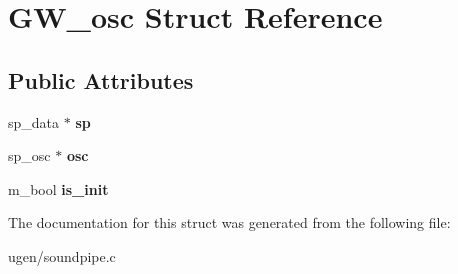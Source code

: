 \hypertarget{structGW__osc}{}\section{G\+W\+\_\+osc Struct Reference}
\label{structGW__osc}
\subsection*{Public Attributes}
\begin{DoxyCompactItemize}
\item 
\hypertarget{structGW__osc_ae638391e665dd21a59002391bd392f88}{}\label{structGW__osc_ae638391e665dd21a59002391bd392f88} 
sp\+\_\+data $\ast$ {\bfseries sp}
\item 
\hypertarget{structGW__osc_aeecbbe8b06ba061d1be04eab74ffec52}{}\label{structGW__osc_aeecbbe8b06ba061d1be04eab74ffec52} 
sp\+\_\+osc $\ast$ {\bfseries osc}
\item 
\hypertarget{structGW__osc_ad2da8b42dcddded22b02659f601e6ade}{}\label{structGW__osc_ad2da8b42dcddded22b02659f601e6ade} 
m\+\_\+bool {\bfseries is\+\_\+init}
\end{DoxyCompactItemize}


The documentation for this struct was generated from the following file\+:\begin{DoxyCompactItemize}
\item 
ugen/soundpipe.\+c\end{DoxyCompactItemize}
